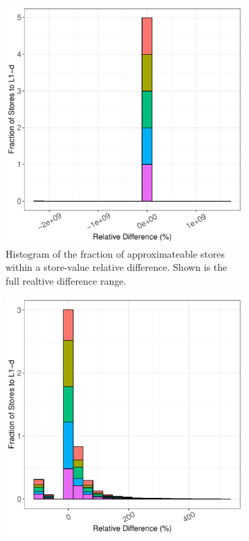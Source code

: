 \begin{figure}[htbp]
	\begin{subfigure}{0.33\textwidth}
		\centering
		\includegraphics[scale=0.4]{graphs/matrix_multiply_top5/full_hist.pdf}
		\caption{Histogram of the fraction of approximateable stores within a store-value relative difference. Shown is the full realtive difference range.}
	\end{subfigure}
	\begin{subfigure}{0.33\textwidth}
		\centering
		\includegraphics[scale=0.4]{graphs/matrix_multiply_top5/narrow_hist.pdf}

\end{subfigure}
\end{figure}
